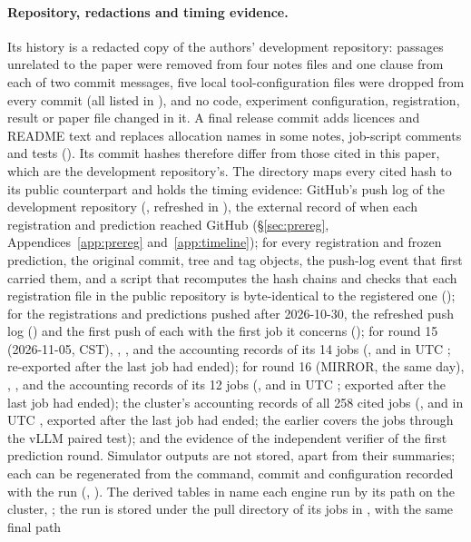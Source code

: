 \paragraph{Repository, redactions and timing evidence.} Its history is a redacted copy of the authors' development repository: passages unrelated to the paper were removed from four notes files and one clause from each of two commit messages, five local tool-configuration files were dropped from every commit (all listed in ), and no code, experiment configuration, registration, result or paper file changed in it. A final release commit adds licences and README text and replaces allocation names in some notes, job-script comments and tests (). Its commit hashes therefore differ from those cited in this paper, which are the development repository's. The directory  maps every cited hash to its public counterpart and holds the timing evidence: GitHub's push log of the development repository (, refreshed in ), the external record of when each registration and prediction reached GitHub (\S\ref{sec:prereg}, Appendices~\ref{app:prereg} and~\ref{app:timeline}); for every registration and frozen prediction, the original commit, tree and tag objects, the push-log event that first carried them, and a script that recomputes the hash chains and checks that each registration file in the public repository is byte-identical to the registered one (); for the registrations and predictions pushed after 2026-10-30, the refreshed push log () and the first push of each with the first job it concerns (); for round 15 (2026-11-05, CST), , ,  and the accounting records of its 14 jobs (, and in UTC ; re-exported after the last job had ended); for round 16 (MIRROR, the same day), , ,  and the accounting records of its 12 jobs (, and in UTC ; exported after the last job had ended); the cluster's accounting records of all 258 cited jobs (, and in UTC , exported after the last job had ended; the earlier  covers the jobs through the vLLM paired test); and the evidence of the independent verifier of the first prediction round. Simulator outputs are not stored, apart from their summaries; each can be regenerated from the command, commit and configuration recorded with the run (, ). The derived tables in  name each engine run by its path on the cluster, ; the run is stored under the pull directory of its jobs in , with the same final path 